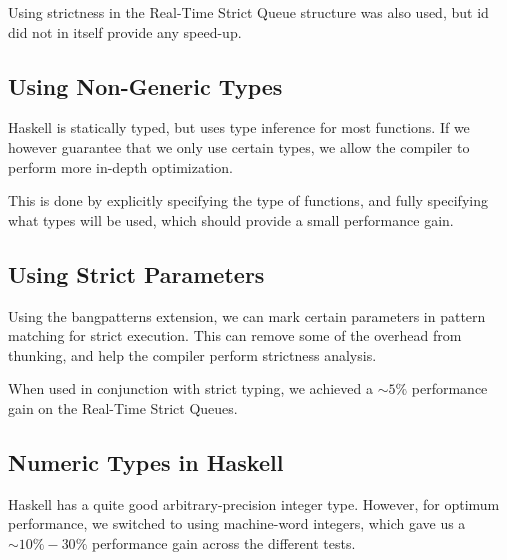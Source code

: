 Using strictness in the Real-Time Strict Queue structure was also used, but id did not in itself provide any speed-up.

\subsection{Using Non-Generic Types}

Haskell is statically typed, but uses type inference for most functions. If we however guarantee that we only use certain types, we allow the compiler to perform more in-depth optimization. 

This is done by explicitly specifying the type of functions, and fully specifying what types will be used, which should provide a small performance gain.

\subsection{Using Strict Parameters}

Using the bangpatterns extension, we can mark certain parameters in pattern matching for strict execution. This can remove some of the overhead from thunking, and help the compiler perform strictness analysis.

When used in conjunction with strict typing, we achieved a $\sim 5\%$ performance gain on the Real-Time Strict Queues.

\subsection{Numeric Types in Haskell}

Haskell has a quite good arbitrary-precision integer type. However, for optimum performance, we switched to using machine-word integers, which gave us a $\sim 10\%-30\%$ performance gain across the different tests.

